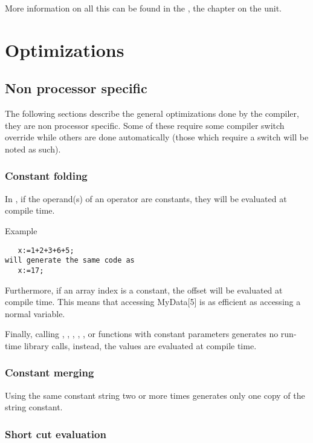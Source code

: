 \documentclass{report}
\begin{document}
More information on all this can be found in the \unitsref, the chapter on
the  unit.

\chapter{Optimizations}

\section{ Non processor specific }

The following sections describe the general optimizations
done by the compiler, they are non processor specific. Some
of these require some compiler switch override while others are done
automatically (those which require a switch will be noted as such).

\subsection{ Constant folding }

In \fpc, if the operand(s) of an operator are constants, they
will be evaluated at compile time.

Example

\begin{verbatim}
   x:=1+2+3+6+5;
will generate the same code as
   x:=17;
\end{verbatim}

Furthermore, if an array index is a constant, the offset will
be evaluated at compile time. This means that accessing MyData[5]
is as efficient as accessing a normal variable.

Finally, calling , , , , ,
or  functions with constant parameters generates no
run-time library calls, instead, the values are evaluated at
compile time.

\subsection{ Constant merging }

Using the same constant string two or more times generates only
one copy of the string constant.

\subsection{ Short cut evaluation }
\end{document}
